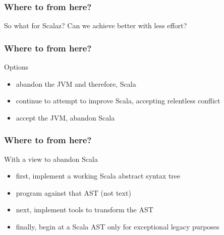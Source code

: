 \begin{frame}
\frametitle{Where to from here?}
\begin{block}{So what for Scalaz?}
Can we achieve better with less effort?
\end{block}
\end{frame}


\begin{frame}
\frametitle{Where to from here?}
\begin{block}{Options}
\begin{itemize}
  \item<1> abandon the JVM and therefore, Scala
  \item<2> continue to attempt to improve Scala, accepting relentless conflict
  \item<3> accept the JVM, abandon Scala
\end{itemize}
\end{block}
\end{frame}


\begin{frame}
\frametitle{Where to from here?}
\begin{block}{With a view to abandon Scala}
\begin{itemize}
  \item<1-> first, implement a working Scala abstract syntax tree
  \item<1-> program against that AST (not text)
  \item<2-> next, implement tools to transform the AST
  \item<3-> finally, begin at a Scala AST only for exceptional legacy purposes
\end{itemize}
\end{block}
\end{frame}
